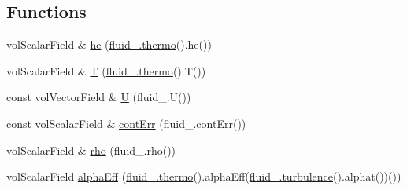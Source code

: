 \subsection*{Functions}
\begin{DoxyCompactItemize}
\item 
vol\+Scalar\+Field \& \hyperlink{EEqn__1p_8H_aaacc8fea926e2b83e418a1ad3c1e8c43}{he} (\hyperlink{EEqns__2p_8H_a9d615e711281a88a96c648787c7dbd32}{fluid\+\_\+.\+thermo}().he())
\item 
vol\+Scalar\+Field \& \hyperlink{EEqn__1p_8H_ad0f94aa7ea43d4be0bae24e3a89aad0c}{T} (\hyperlink{EEqns__2p_8H_a9d615e711281a88a96c648787c7dbd32}{fluid\+\_\+.\+thermo}().T())
\item 
const vol\+Vector\+Field \& \hyperlink{EEqn__1p_8H_ab03f4990970dd7e1d06102a8dab92779}{U} (fluid\+\_\+.\+U())
\item 
const vol\+Scalar\+Field \& \hyperlink{EEqn__1p_8H_ac772c4e2535e2242a1e052c268cb9c19}{cont\+Err} (fluid\+\_\+.\+cont\+Err())
\item 
vol\+Scalar\+Field \& \hyperlink{EEqn__1p_8H_ae046bbf7be207060e69c76a64c652150}{rho} (fluid\+\_\+.\+rho())
\item 
vol\+Scalar\+Field \hyperlink{EEqn__1p_8H_ab798e74f18ad4d1766f4a26a84b2b68c}{alpha\+Eff} (\hyperlink{EEqns__2p_8H_a9d615e711281a88a96c648787c7dbd32}{fluid\+\_\+.\+thermo}().alpha\+Eff(\hyperlink{UEqns__2p_8H_a1769aacd25eec8e30f213b1c177e12d6}{fluid\+\_\+.\+turbulence}().alphat())())
\item 

\end{DoxyCompactItemize}
